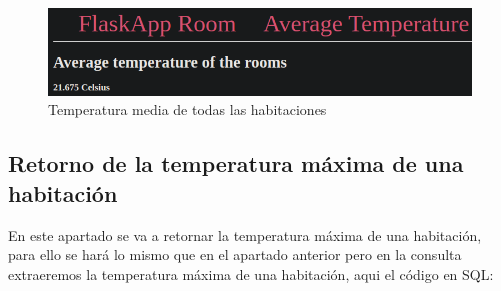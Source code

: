 \documentclass[11pt]{report}
\begin{document}
\begin{figure}[H]
  \centering
  \includegraphics[scale=0.45]{img/average_temperature.png}
  \caption{Temperatura media de todas las habitaciones}
\end{figure}

\subsection{Retorno de la temperatura máxima de una habitación}
En este apartado se va a retornar la temperatura máxima de una habitación, para ello se hará lo mismo que en el apartado
anterior pero en la consulta extraeremos la temperatura máxima de una habitación, aqui el código en SQL:
\lstset{style=mystyle}

\end{document}
